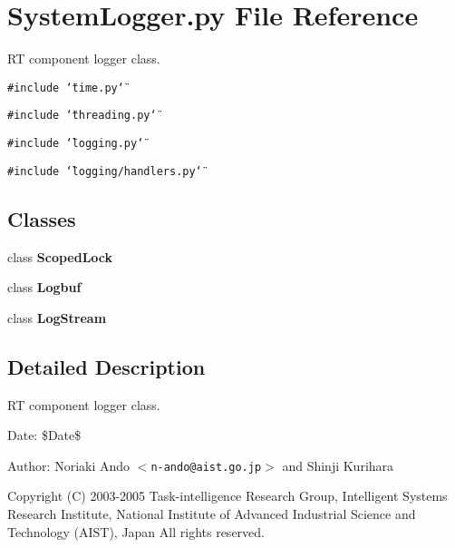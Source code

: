 \section{System\-Logger.py File Reference}
\label{SystemLogger_8py}
RT component logger class. 

{\tt \#include \char`\"{}time.py\char`\"{}}\par
{\tt \#include \char`\"{}threading.py\char`\"{}}\par
{\tt \#include \char`\"{}logging.py\char`\"{}}\par
{\tt \#include \char`\"{}logging/handlers.py\char`\"{}}\par
\subsection*{Classes}
\begin{CompactItemize}
\item 
class {\bf Scoped\-Lock}
\item 
class {\bf Logbuf}
\item 
class {\bf Log\-Stream}
\end{CompactItemize}


\subsection{Detailed Description}
RT component logger class. 

\begin{Desc}
\item[Date:]\$Date\$ \end{Desc}
\begin{Desc}
\item[Author:]Noriaki Ando $<${\tt n-ando@aist.go.jp}$>$ and Shinji Kurihara\end{Desc}
Copyright (C) 2003-2005 Task-intelligence Research Group, Intelligent Systems Research Institute, National Institute of Advanced Industrial Science and Technology (AIST), Japan All rights reserved.